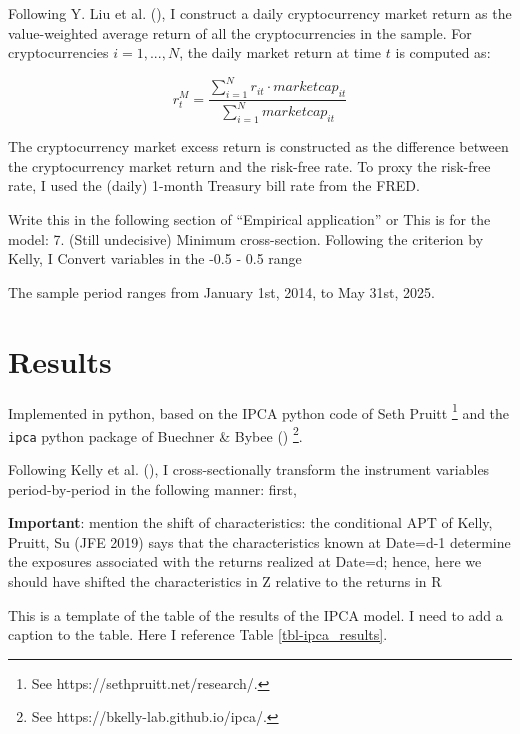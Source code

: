 \documentclass[
  12pt,
  a4paper,
  openany]{scrbook}
\begin{document}
Following Y. Liu et al. (), I
construct a daily cryptocurrency market return as the value-weighted
average return of all the cryptocurrencies in the sample. For
cryptocurrencies \(i = 1, ..., N\), the daily market return at time
\(t\) is computed as:

\[
r_t^M = \frac{\sum_{i=1}^N r_{it} \cdot marketcap_{it}}
             {\sum_{i=1}^N marketcap_{it} }
\]

The cryptocurrency market excess return is constructed as the difference
between the cryptocurrency market return and the risk-free rate. To
proxy the risk-free rate, I used the (daily) 1-month Treasury bill rate
from the FRED.

Write this in the following section of ``Empirical application'' or This
is for the model: 7. (Still undecisive) Minimum cross-section. Following
the criterion by Kelly, I Convert variables in the -0.5 - 0.5 range

The sample period ranges from January 1st, 2014, to May 31st, 2025.


\chapter{Results}\label{results}

Implemented in python, based on the IPCA python code of Seth Pruitt
\footnote{See https://sethpruitt.net/research/.} and the \texttt{ipca}
python package of Buechner \& Bybee ()
\footnote{See https://bkelly-lab.github.io/ipca/.}.

Following Kelly et al.
(), I cross-sectionally
transform the instrument variables period-by-period in the following
manner: first,

\textbf{Important}: mention the shift of characteristics: the
conditional APT of Kelly, Pruitt, Su (JFE 2019) says that the
characteristics known at Date=d-1 determine the exposures associated
with the returns realized at Date=d; hence, here we should have shifted
the characteristics in Z relative to the returns in R

This is a template of the table of the results of the IPCA model. I need
to add a caption to the table. Here I reference Table
\ref{tbl-ipca_results}.
\end{document}

